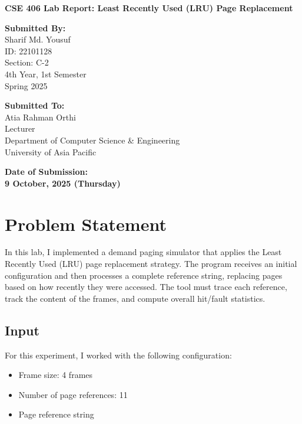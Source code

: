 \documentclass[12pt,a4paper]{article}
\begin{document}
\begin{titlepage}
	\centering
	\vspace*{3cm}

	{\Huge\bfseries CSE 406 \textendash{} Lab Report: Least Recently Used (LRU) Page Replacement \par}
	\vspace{2.5cm}

	\noindent
	\begin{minipage}[t]{0.48\textwidth}
		{\large\bfseries Submitted By:}\\[0.5em]
		\Large
		Sharif Md. Yousuf \\
		ID: 22101128 \\
		Section: C-2 \\
		4th Year, 1st Semester \\
		Spring 2025
	\end{minipage}
	\hfill
	\begin{minipage}[t]{0.48\textwidth}
		{\large\bfseries Submitted To:}\\[0.5em]
		\Large
		Atia Rahman Orthi \\
		Lecturer \\
		Department of Computer Science \& Engineering \\
		University of Asia Pacific
	\end{minipage}

	\vfill

	{\Large\bfseries Date of Submission:} \\[0.5em]
	{\LARGE\bfseries 9 October, 2025 (Thursday)}

	\vspace*{2cm}
\end{titlepage}

\section{Problem Statement}
In this lab, I implemented a demand paging simulator that applies the Least Recently Used (LRU) page replacement strategy. The program receives an initial configuration and then processes a complete reference string, replacing pages based on how recently they were accessed. The tool must trace each reference, track the content of the frames, and compute overall hit/fault statistics.

\subsection*{Input}
For this experiment, I worked with the following configuration:
\begin{itemize}
	\item Frame size: 4 frames
	\item Number of page references: 11
	\item Page reference string
\end{itemize}
\end{document}
